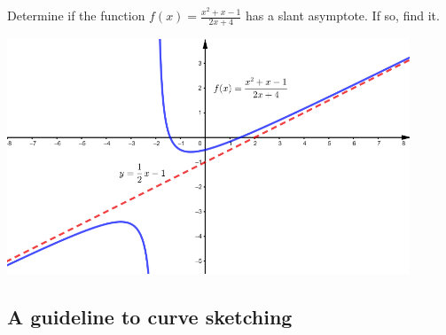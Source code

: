 \begin{example}

Determine if the function \(f(x)=\frac{x^2+x-1}{2x+4}\) has a slant
asymptote. If so, find it.

\includegraphics[width=0.9\textwidth]{img/image-20200415114002896.png}

\end{example}
\vspace*{6\baselineskip}

\hypertarget{a-guideline-to-curve-sketching}{%
\subsection{A guideline to curve
sketching}\label{a-guideline-to-curve-sketching}}

